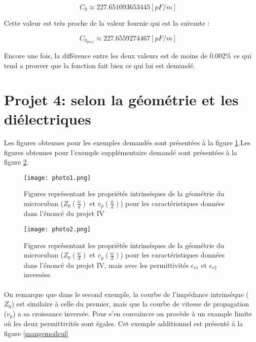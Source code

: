 \begin{equation}
	C_0 \approx 227.651093653445[pF/m]
\end{equation}

Cette valeur est très proche de la valeur fournie qui est la suivante :

\begin{equation}
	C_{0_{prof}} \approx 227.6559274467 [pF/m]
\end{equation}

Encore une fois, la différence entre les deux valeurs est de moins de 0.002\% ce qui tend a prouver que la fonction fait bien ce qui lui est demandé.

\section{Projet 4:  selon la géométrie et les diélectriques}

Les figures obtenues pour les exemples demandés sont présentées à la figure \ref{fig_marde}.Les figures obtenues pour l'exemple supplémentaire demandé sont présentées à la figure \ref{mangedlamarde}.

\begin{figure}[htb]
\begin{center}
\texttt{[image: photo1.png]}
\label{fig_marde}
\caption{Figures représentant les propriétés intrinsèques de la géométrie du microruban ($Z_0 (\frac{w}{d})$ et $v_p(\frac{w}{d})$) pour les caractéristiques données dans l'énoncé du projet IV}
\end{center}
\end{figure}
\begin{figure}[htb]
\begin{center}
\texttt{[image: photo2.png]}
\caption{Figures représentant les propriétés intrinsèques de la géométrie du microruban ($Z_0 (\frac{w}{d})$ et $v_p(\frac{w}{d})$) pour les caractéristiques données dans l'énoncé du projet IV, mais avec les permittivités $\epsilon_{r1}$ et $\epsilon_{r2}$ inversées}
\end{center}
\label{mangedlamarde}
\end{figure}

\paragraph{}On remarque que dans le second exemple, la courbe de l'impédance intrinsèque ($Z_0$) est similaire à celle du premier, mais que la courbe de vitesse de propagation ($v_p$) a sa croissance inversée. Pour s'en convaincre on procède à un example limite où les deux permittivités sont égales. Cet exemple additionnel est présenté à la figure \ref{mangemoilcul}

